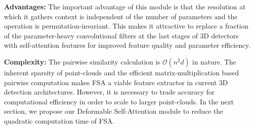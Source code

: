 \documentclass[10pt,twocolumn,letterpaper]{article}
\begin{document}
\textbf{Advantages:} The important advantage of this module is that the resolution at which it gathers context is independent of the number of parameters and the operation is permutation-invariant. This makes it attractive to replace a fraction of the parameter-heavy convolutional filters at the last stages of 3D detectors with self-attention features for improved feature quality and parameter efficiency.

\textbf{Complexity:} The pairwise similarity calculation is $\mathcal{O}(n^2d)$ in nature. The inherent sparsity of point-clouds and the efficient matrix-multiplication based pairwise computation makes FSA a viable feature extractor in current 3D detection architectures. However, it is necessary to trade accuracy for computational efficiency in order to scale to larger point-clouds. In the next section, we propose our Deformable Self-Attention module to reduce the quadratic computation time of FSA.
\end{document}
